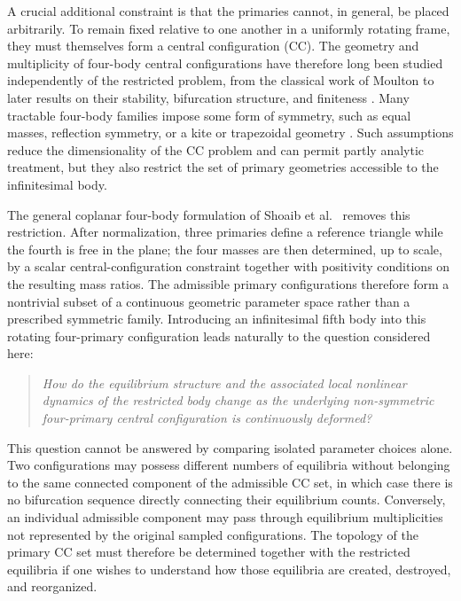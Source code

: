 A crucial additional constraint is that the primaries cannot, in general, be placed arbitrarily. To remain fixed relative to one another in a uniformly rotating frame, they must themselves form a central configuration (CC). The geometry and multiplicity of four-body central configurations have therefore long been studied independently of the restricted problem, from the classical work of Moulton \cite{moulton1900} to later results on their stability, bifurcation structure, and finiteness \cite{simo1978,hamptonmoeckel2006}. Many tractable four-body families impose some form of symmetry, such as equal masses, reflection symmetry, or a kite or trapezoidal geometry \cite{stevesroy1998,benhammouda2020}. Such assumptions reduce the dimensionality of the CC problem and can permit partly analytic treatment, but they also restrict the set of primary geometries accessible to the infinitesimal body.

The general coplanar four-body formulation of Shoaib et al.\ \cite{shoaib2023} removes this restriction. After normalization, three primaries define a reference triangle while the fourth is free in the plane; the four masses are then determined, up to scale, by a scalar central-configuration constraint together with positivity conditions on the resulting mass ratios. The admissible primary configurations therefore form a nontrivial subset of a continuous geometric parameter space rather than a prescribed symmetric family. Introducing an infinitesimal fifth body into this rotating four-primary configuration leads naturally to the question considered here:

\begin{quote}
\emph{How do the equilibrium structure and the associated local nonlinear dynamics of the restricted body change as the underlying non-symmetric four-primary central configuration is continuously deformed?}
\end{quote}

This question cannot be answered by comparing isolated parameter choices alone. Two configurations may possess different numbers of equilibria without belonging to the same connected component of the admissible CC set, in which case there is no bifurcation sequence directly connecting their equilibrium counts. Conversely, an individual admissible component may pass through equilibrium multiplicities not represented by the original sampled configurations. The topology of the primary CC set must therefore be determined together with the restricted equilibria if one wishes to understand how those equilibria are created, destroyed, and reorganized.

